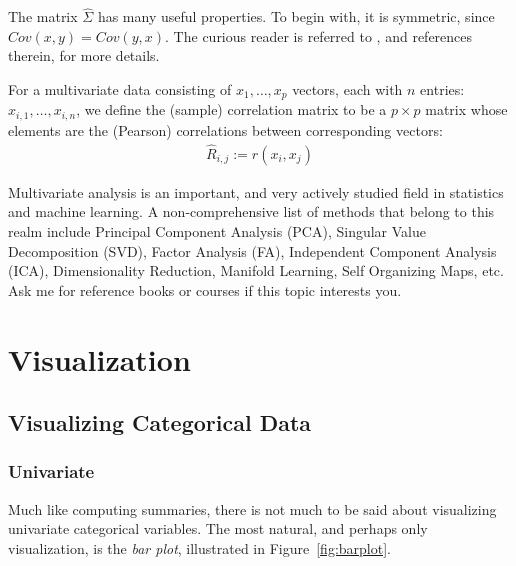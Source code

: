 \documentclass[12pt,a4paper]{report}
\begin{document}
\begin{extra}
The matrix $\hat{\Sigma}$ has many useful properties. 
To begin with, it is symmetric, since $Cov(x,y)=Cov(y,x)$.
The curious reader is referred to \cite{petersen_matrix_2006}, and references therein, for more details.
\end{extra}

\begin{definition}
For a multivariate data consisting of $x_1,\dots,x_p$ vectors, each with $n$ entries: $x_{i,1},\dots,x_{i,n}$, we define the (sample) correlation matrix to be a $p\times p$ matrix whose elements are the (Pearson) correlations between corresponding vectors:
\begin{align}
	\hat{R}_{i,j}:= r(x_i, x_j)
\end{align}
\end{definition}


\begin{extra}
Multivariate analysis is an important, and very actively studied field in statistics and machine learning.
A non-comprehensive list of methods that belong to this realm include 
Principal Component Analysis (PCA),
Singular Value Decomposition (SVD), 
Factor Analysis (FA), 
Independent Component Analysis (ICA),
Dimensionality Reduction, 
Manifold Learning, 
Self Organizing Maps, 
etc.
Ask me for reference books or courses if this topic interests you.
\end{extra}

\afterpage{\clearpage}


\section{Visualization}
\label{sec:visualizations}

\subsection{Visualizing Categorical Data}



\subsubsection{Univariate}
Much like computing summaries, there is not much to be said about visualizing univariate categorical variables. 
The most natural, and perhaps only visualization, is the \emph{bar plot}, illustrated in Figure~\ref{fig:barplot}.
\end{document}
